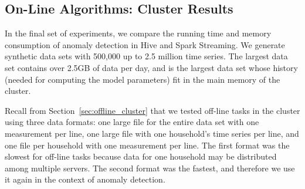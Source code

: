 \documentclass[prodmode,acmtods]{acmsmall}
\begin{document}


\subsection{On-Line Algorithms: Cluster Results} \label{sec:online_cluster}

In the final set of experiments, we compare the running time and memory consumption of anomaly detection in Hive and Spark Streaming.  We generate synthetic data sets with 500,000 up to 2.5 million time series.  The largest data set contains over 2.5GB of data per day, and is the largest data set whose history (needed for computing the model parameters) fit in the main memory of the cluster.

Recall from Section~\ref{sec:offline_cluster} that we tested off-line tasks in the cluster using three data formats: one large file for the entire data set with one measurement per line, one large file with one household's time series per line, and one file per household with one measurement per line.  The first format was the slowest for off-line tasks because data for one household may be distributed among multiple servers.  The second format was the fastest, and therefore we use it again in the context of anomaly detection. 
\end{document}
